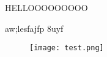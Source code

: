 \documentclass[12pt,letterpaper]{article}
\begin{document}
HELLOOOOOOOOO

aw;lesfajfp 8uyf

\begin{figure}
    \centering
    \texttt{[image: test.png]}
\end{figure}
\end{document}
